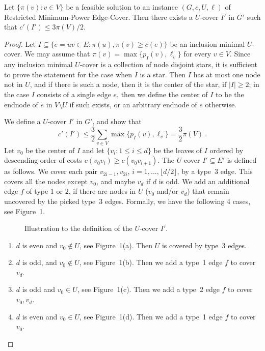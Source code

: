 \documentclass{llncs}
\begin{document}
\begin{lemma} \label{l:pi}
Let $\{\pi(v):v\in V\}$ be a feasible solution to an instance $(G,c,U,\ell)$
of {\sf Restricted Minimum-Power Edge-Cover}.
Then there exists a $U$-cover $I'$ in $G'$ such that 
$c'(I') \leq 3 \pi(V)/2$.
\end{lemma}
\begin{proof}
Let $I\subseteq \{e=uv\in E: \pi(u),\pi(v)\geq c(e)\}$ be an inclusion minimal $U$-cover.
We may assume that $\pi(v)=\max\{p_I(v),\ell_v\}$ for every $v \in V$.
Since any inclusion minimal $U$-cover is a collection of node disjoint stars,
it is sufficient to prove the statement for the case when $I$ is a star.
Then $I$ has at most one node not in $U$, 
and if there is such a node, then it is the center of the star, if $|I| \geq 2$;
in the case $I$ consists of a single edge $e$, then we define the center of $I$ 
to be the endnode of $e$ in $V \setminus U$ if such exists, 
or an arbitrary endnode of $e$ otherwise.

We define a $U$-cover $I'$ in $G'$, and show that 
\begin{equation} \label{e:pi}
c'(I') \leq \frac{3}{2} \sum_{v \in V}\max\{p_I(v),\ell_v\}=\frac{3}{2}\pi(V) \ .
\end{equation}
Let $v_0$ be the center of $I$ and let $\{v_i:1\leq i\leq d\}$ be the leaves of $I$ 
ordered by descending order of costs $c(v_0v_i) \geq c(v_0v_{i+1})$. 
The $U$-cover $I' \subseteq E'$ is defined as follows.
We cover each pair $v_{2i-1},v_{2i}$, $i=1, \ldots,\lfloor d/2 \rfloor$, by a type~3 edge.
This covers all the nodes except $v_0$, and maybe $v_d$ if $d$ is odd.
We add an additional edge $f$ of type 1 or 2, if there are nodes in $U$
($v_0$ and/or $v_d$) that remain uncovered by the picked type~3 edges. 
Formally, we have the following 4 cases, see Figure~1.
\begin{figure} \label{f:cases}
\centering
{}
\caption{Illustration to the definition of the $U$-cover $I'$.}
\end{figure}


\begin{enumerate}
\item
$d$ is even and $v_0 \notin U$, see Figure~1(a). 
Then $U$ is covered by type~3 edges. 
\item
$d$ is odd, and $v_0 \notin U$, see Figure~1(b).  
Then we add a type~1 edge $f$ to cover $v_d$. 
\item
$d$ is odd and $v_0 \in U$, see Figure~1(c). 
Then we add a type~2 edge $f$ to cover $v_0,v_d$.
\item
$d$ is even and $v_0 \in U$, see Figure~1(d). 
Then we add a type~1 edge $f$ to cover $v_0$.
\end{enumerate}




\end{proof}
\end{document}
